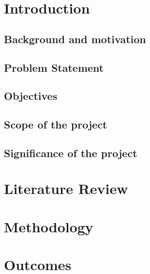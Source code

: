 \documentclass[11pt]{report}
\begin{document}
    \chapter{Introduction}\label{ch:introduction}


    \section{Background and motivation}\label{sec:background-and-motivation}
    


    \section{Problem Statement}\label{sec:problem-statement}
    


    \section{Objectives}\label{sec:objectives}
    


    \section{Scope of the project}\label{sec:scope-of-the-project}
    


    \section{Significance of the project}\label{sec:significance-of-the-project}
    


    \chapter{Literature Review}\label{ch:literature-review}
    


    \chapter{Methodology}\label{ch:methodology}
    


    \chapter{Outcomes}\label{ch:outcomes}
    
\end{document}
